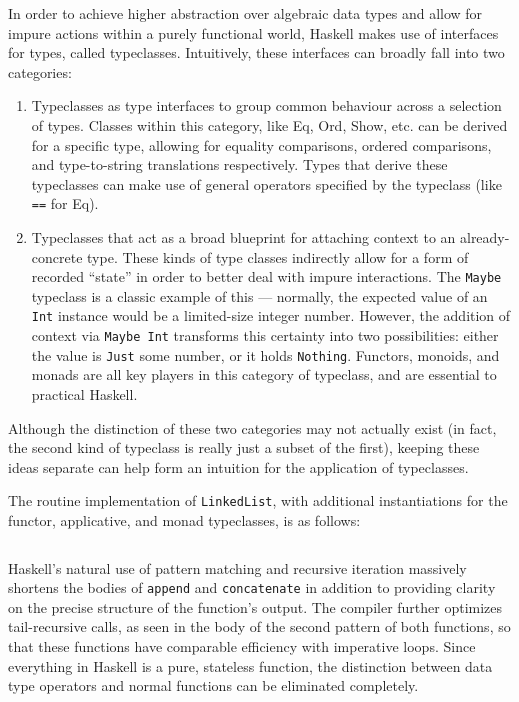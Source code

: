 \documentclass{article}
\begin{document}
In order to achieve higher abstraction over algebraic data types and allow for impure actions within a purely
functional world, Haskell makes use of interfaces for types, called typeclasses. Intuitively,
these interfaces can broadly fall into two categories:
\begin{enumerate}
    \item Typeclasses as type interfaces to group common behaviour across a selection of types. Classes within this category, like
    Eq, Ord, Show, etc. can be derived for a specific type, allowing for equality comparisons, ordered comparisons,
    and type-to-string translations respectively. Types that derive these typeclasses can make use of general operators
    specified by the typeclass (like \texttt{==} for Eq).
    \item Typeclasses that act as a broad blueprint for attaching context to an already-concrete type. These
    kinds of type classes indirectly allow for a form of recorded ``state'' in order to better deal with impure interactions.
    The \texttt{Maybe} typeclass is a classic example of this --- normally, the expected value of an \texttt{Int} instance
    would be a limited-size integer number. However, the addition of context via \texttt{Maybe Int} transforms this
    certainty into two possibilities: either the value is \texttt{Just} some number, or it holds \texttt{Nothing}.
    Functors, monoids, and monads are all key players in this category of typeclass, and are essential to practical Haskell.
\end{enumerate}
Although the distinction of these two categories may not actually exist (in fact, the second kind of typeclass is really
just a subset of the first), keeping these ideas separate can help form an intuition for the application of typeclasses.

The routine implementation of \texttt{LinkedList}, with additional instantiations for the functor, applicative,
and monad typeclasses, is as follows:
\inputminted{haskell}{linked_list/main.hs}
Haskell's natural use of pattern matching and recursive iteration massively shortens the bodies of
\texttt{append} and \texttt{concatenate} in addition to providing clarity on the precise structure of the function's
output. The compiler further optimizes tail-recursive calls, as seen in the body of the second pattern of both functions,
so that these functions have comparable efficiency with imperative loops.
Since everything in Haskell is a pure, stateless function, the distinction between data type
operators and normal functions can be eliminated completely.
\end{document}
